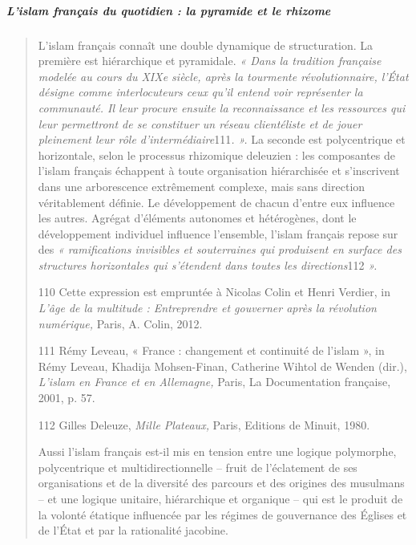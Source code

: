 \hypertarget{lislam-franuxe7ais-du-quotidien-la-pyramide-et-le-rhizome}{%
\subparagraph{L'islam français du quotidien : la pyramide et le
rhizome}\label{lislam-franuxe7ais-du-quotidien-la-pyramide-et-le-rhizome}}

\begin{quote}
L'islam français connaît une double dynamique de structuration. La
première est hiérarchique et pyramidale. \emph{« Dans la tradition
française modelée au cours du XIXe siècle, après la tourmente
révolutionnaire, l'État désigne comme interlocuteurs ceux qu'il entend
voir représenter la communauté. Il leur procure ensuite la
reconnaissance et les ressources qui leur permettront de se constituer
un réseau clientéliste et de jouer pleinement leur rôle
d'intermédiaire}111\emph{. ».} La seconde est polycentrique et
horizontale, selon le processus rhizomique deleuzien : les composantes
de l'islam français échappent à toute organisation hiérarchisée et
s'inscrivent dans une arborescence extrêmement complexe, mais sans
direction véritablement définie. Le développement de chacun d'entre eux
influence les autres. Agrégat d'éléments autonomes et hétérogènes, dont
le développement individuel influence l'ensemble, l'islam français
repose sur des \emph{« ramifications invisibles et souterraines qui
produisent en surface des structures horizontales qui s'étendent dans
toutes les directions}112 \emph{».}

110 Cette expression est empruntée à Nicolas Colin et Henri Verdier, in
\emph{L'âge de la multitude : Entreprendre et gouverner après la
révolution numérique,} Paris, A. Colin, 2012.

111 Rémy Leveau, « France : changement et continuité de l'islam », in
Rémy Leveau, Khadija Mohsen-Finan, Catherine Wihtol de Wenden (dir.),
\emph{L'islam en France et en Allemagne,} Paris, La Documentation
française, 2001, p. 57.

112 Gilles Deleuze, \emph{Mille Plateaux,} Paris, Editions de Minuit,
1980.



Aussi l'islam français est-il mis en tension entre une logique
polymorphe, polycentrique et multidirectionnelle -- fruit de
l'éclatement de ses organisations et de la diversité des parcours et des
origines des musulmans -- et une logique unitaire, hiérarchique et
organique -- qui est le produit de la volonté étatique influencée par
les régimes de gouvernance des Églises et de l'État et par la
rationalité jacobine.


\end{quote}
